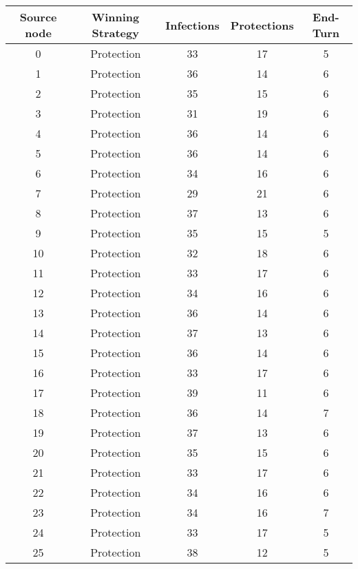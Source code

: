\documentclass[results.tex]{subfiles}
\begin{document}
\begin{center}
  \begin{tabular}{| c || c | c | c | c |}
    \hline
    {\bfseries Source node} & {\bfseries Winning Strategy} & {\bfseries Infections} & {\bfseries Protections} & {\bfseries End-Turn} \\  %
    \hline\hline
    0 & Protection & 33 & 17 & 5 \\ 
    \hline
    1 & Protection & 36 & 14 & 6 \\ 
    \hline
    2 & Protection & 35 & 15 & 6 \\ 
    \hline
    3 & Protection & 31 & 19 & 6 \\ 
    \hline
    4 & Protection & 36 & 14 & 6 \\ 
    \hline
    5 & Protection & 36 & 14 & 6 \\ 
    \hline
    6 & Protection & 34 & 16 & 6 \\ 
    \hline
    7 & Protection & 29 & 21 & 6 \\ 
    \hline
    8 & Protection & 37 & 13 & 6 \\ 
    \hline
    9 & Protection & 35 & 15 & 5 \\ 
    \hline
    10 & Protection & 32 & 18 & 6 \\ 
    \hline
    11 & Protection & 33 & 17 & 6 \\ 
    \hline
    12 & Protection & 34 & 16 & 6 \\ 
    \hline
    13 & Protection & 36 & 14 & 6 \\ 
    \hline
    14 & Protection & 37 & 13 & 6 \\ 
    \hline
    15 & Protection & 36 & 14 & 6 \\ 
    \hline
    16 & Protection & 33 & 17 & 6 \\ 
    \hline
    17 & Protection & 39 & 11 & 6 \\ 
    \hline
    18 & Protection & 36 & 14 & 7 \\ 
    \hline
    19 & Protection & 37 & 13 & 6 \\ 
    \hline
    20 & Protection & 35 & 15 & 6 \\ 
    \hline
    21 & Protection & 33 & 17 & 6 \\ 
    \hline
    22 & Protection & 34 & 16 & 6 \\ 
    \hline
    23 & Protection & 34 & 16 & 7 \\ 
    \hline
    24 & Protection & 33 & 17 & 5 \\ 
    \hline
    25 & Protection & 38 & 12 & 5 \\ 

\end{tabular}
\end{center}
\end{document}
